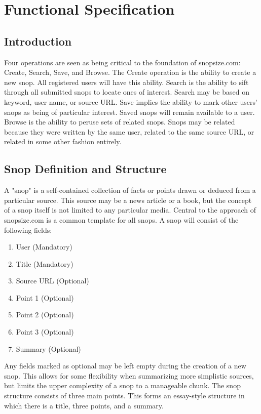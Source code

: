 \documentclass[11pt]{article}
\begin{document}
\section{Functional Specification}
\label{sec:functional_spec}
\subsection{Introduction}
Four operations are seen as being critical to the foundation of snopsize.com: Create, Search, Save, and Browse. The Create operation is the ability to create a new snop. All registered users will have this ability. Search is the ability to sift through all submitted snops to locate ones of interest. Search may be based on keyword, user name, or source URL. Save implies the ability to mark other users' snops as being of particular interest. Saved snops will remain available to a user. Browse is the ability to peruse sets of related snops. Snops may be related because they were written by the same user, related to the same source URL, or related in some other fashion entirely.
\subsection{Snop Definition and Structure}
\label{sec:snop_structure}
A "snop" is a self-contained collection of facts or points drawn or deduced from a particular source. This source may be a news article or a book, but the concept of a snop itself is not limited to any particular media. Central to the approach of snopsize.com is a common template for all snops. A snop will consist of the following fields:
\begin{enumerate}
\item User (Mandatory)
\item Title (Mandatory)
\item Source URL (Optional)
\item Point 1 (Optional)
\item Point 2 (Optional)
\item Point 3 (Optional)
\item Summary (Optional)
\end{enumerate}
Any fields marked as optional may be left empty during the creation of a new snop. This allows for some flexibility when summarizing more simplistic sources, but limits the upper complexity of a snop to a manageable chunk. The snop structure consists of three main points. This forms an essay-style structure in which there is a title, three points, and a summary.
\end{document}

